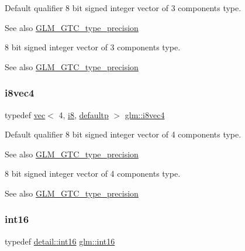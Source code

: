Default qualifier 8 bit signed integer vector of 3 components type. \begin{DoxySeeAlso}{See also}
\mbox{\hyperlink{group__gtc__type__precision}{G\+L\+M\+\_\+\+G\+T\+C\+\_\+type\+\_\+precision}}
\end{DoxySeeAlso}
8 bit signed integer vector of 3 components type. \begin{DoxySeeAlso}{See also}
\mbox{\hyperlink{group__gtc__type__precision}{G\+L\+M\+\_\+\+G\+T\+C\+\_\+type\+\_\+precision}} 
\end{DoxySeeAlso}
\mbox{\label{group__gtc__type__precision_gaaad99cfb998ddcb74e9c33d0149fdd0e}} 
\subsubsection{\texorpdfstring{i8vec4}{i8vec4}}
{\footnotesize\ttfamily typedef \mbox{\hyperlink{structglm_1_1vec}{vec}}$<$ 4, \mbox{\hyperlink{group__gtc__type__precision_gaae064be68b7d36cd7910c16e8ad18bba}{i8}}, \mbox{\hyperlink{namespaceglm_a36ed105b07c7746804d7fdc7cc90ff25a9d21ccd8b5a009ec7eb7677befc3bf51}{defaultp}} $>$ \mbox{\hyperlink{group__gtc__type__precision_gaaad99cfb998ddcb74e9c33d0149fdd0e}{glm\+::i8vec4}}}

Default qualifier 8 bit signed integer vector of 4 components type. \begin{DoxySeeAlso}{See also}
\mbox{\hyperlink{group__gtc__type__precision}{G\+L\+M\+\_\+\+G\+T\+C\+\_\+type\+\_\+precision}}
\end{DoxySeeAlso}
8 bit signed integer vector of 4 components type. \begin{DoxySeeAlso}{See also}
\mbox{\hyperlink{group__gtc__type__precision}{G\+L\+M\+\_\+\+G\+T\+C\+\_\+type\+\_\+precision}} 
\end{DoxySeeAlso}
\mbox{\label{group__gtc__type__precision_ga2945a61d12771f8954994fcddf02b021}} 
\subsubsection{\texorpdfstring{int16}{int16}}
{\footnotesize\ttfamily typedef \mbox{\hyperlink{namespaceglm_1_1detail_a375938874ca4f0a0982ec6373b56117b}{detail\+::int16}} \mbox{\hyperlink{group__gtc__type__precision_ga2945a61d12771f8954994fcddf02b021}{glm\+::int16}}}

